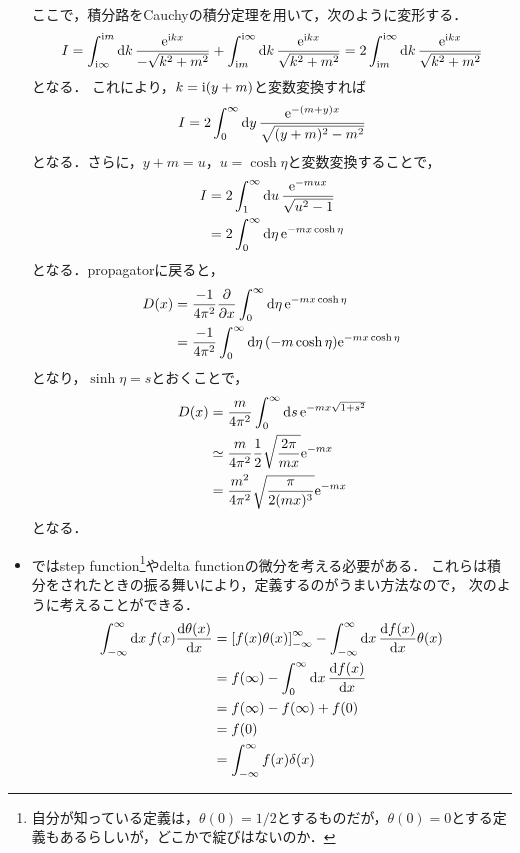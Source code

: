 \begin{itemize}
		ここで，積分路をCauchyの積分定理を用いて，次のように変形する．
		\begin{equation}
				I = \int_{\mathrm{i}\infty}^{\mathrm{i} m}\dd{k}\frac{\mathrm{e}^{\mathrm{i} kx}}{-\sqrt{k^2+m^2}}+\int_{\mathrm{i} m}^{\mathrm{i}\infty} \dd{k}\frac{\mathrm{e}^{\mathrm{i} kx}}{\sqrt{k^2+m^2}} =2 \int_{\mathrm{i} m}^{\mathrm{i}\infty} \dd{k}\frac{\mathrm{e}^{\mathrm{i} kx}}{\sqrt{k^2+m^2}}
		\end{equation}
		となる．
		これにより，$k=\mathrm{i}(y+m) $と変数変換すれば
		\begin{equation}
				I = 2\int_{0}^{\infty}\dd{y}\frac{\mathrm{e}^{-(m+y)x}}{\sqrt{(y+m)^2-m^2}}
		\end{equation}
		となる．さらに，$y+m=u $，$u=\cosh\eta $と変数変換することで，
		\begin{align}
				I &=2 \int_{1}^{\infty} \dd{u}\frac{\mathrm{e}^{-mux}}{\sqrt{u^2-1}}\\
				  &=2 \int_{0}^{\infty} \dd{\eta}\mathrm{e}^{-mx\cosh\eta}
		\end{align}
		となる．propagatorに戻ると，
		\begin{align}
				D(x) &= \frac{-1}{4\pi^2}\pdv{}{x}\int_{0}^{\infty} \dd{\eta}\mathrm{e}^{-mx\cosh\eta}\\
					 &= \frac{-1}{4\pi^2}\int_{0}^{\infty}\dd{\eta}(-m\cosh\eta)\mathrm{e}^{-mx\cosh\eta}
		\end{align}
		となり，$\sinh\eta=s $とおくことで，
		\begin{align}
				D(x) &= \frac{m}{4\pi^2}\int_{0}^{\infty}\dd{s}\mathrm{e}^{-mx\sqrt{1+s^2}}\\
					 &\simeq \frac{m}{4\pi^2}\frac{1}{2}\sqrt{\frac{2\pi}{mx}}\mathrm{e}^{-mx}\\
					 &= \frac{m^2}{4\pi^2}\sqrt{\frac{\pi}{2(mx)^3}}\mathrm{e}^{-mx}
		\end{align}
		となる．
	\item {}ではstep function\footnote{自分が知っている定義は，$\theta(0) = 1/2$とするものだが，$\theta(0)=0$とする定義もあるらしいが，どこかで綻びはないのか．}やdelta functionの微分を考える必要がある．
		これらは積分をされたときの振る舞いにより，定義するのがうまい方法なので，
		次のように考えることができる．
		\begin{align}
			\int_{-\infty}^{\infty} \dd{x}f(x)\dv{\theta(x)}{x}
			&= \qty[f(x)\theta(x)]_{-\infty}^{\infty} - \int_{-\infty}^{\infty}\dd{x} \dv{f(x)}{x}\theta(x)\\
			&= f(\infty)-\int_{0}^{\infty}\dd{x} \dv{f(x)}{x}\\
			&= f(\infty)-f(\infty)+f(0)\\
			&= f(0)\\
			&= \int_{-\infty}^{\infty}f(x)\delta(x)

\end{align}
\end{itemize}
